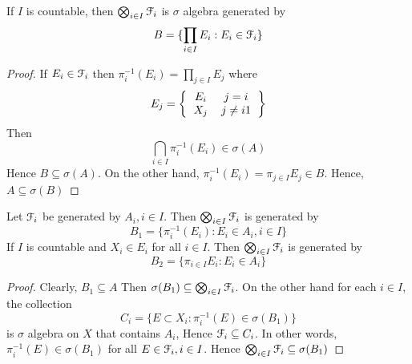 \documentclass[a4paper,english,12pt]{article}
\begin{document}
\begin{prop}
	If $I$ is countable, then $\bigotimes_{i\in I} \mathcal{F}_i$ is $\sigma$ algebra generated by \[B= \{\prod_{i\in I} E_i : E_i \in \mathcal{F}_i\}\]
\end{prop}
\begin{proof}
If $E_i \in \mathcal{F}_i$ then $\pi_i ^ {-1}(E_i) = \prod_{j\in I} E_j$ where \[E_j =  
\left \{
  \begin{tabular}{ccc}
  $E_i$ &  $j=i$  \\
  $X_j$  & $j \neq i$1 
  \end{tabular}
\right \}
\]  Then  \[ \bigcap_{i\in I} \pi_i ^{-1} (E_i) \in \sigma(A)\]  Hence $B \subseteq \sigma(A)$. On the other hand, $\pi_i ^{-1} (E_i) = \pi_{j\in I} E_j \in B$. Hence, $A \subseteq \sigma(B)$
\end{proof}
\begin{prop}
Let $\mathcal{F}_i$ be generated by $A_i, i \in I$. Then $\bigotimes_{i\in I} \mathcal{F}_i$ is generated by  \[B_1 = \{\pi_i^{-1} (E_i) : E_i \in A_i, i \in I\}\]  If $I$ is countable and $X_i \in E_i $ for all $i \in I$. Then $\bigotimes_{i\in I} \mathcal{F}_i$ is generated by  \[B_2 = \{\pi_{i\in I} E_i: E_i \in A_i \}\] 
\end{prop}
\begin{proof}
Clearly, $B_1 \subseteq A$ Then $\sigma(B_1) \subseteq \bigotimes_{i\in I} \mathcal{F}_i$. On the other hand for each $i \in I$, the collection  \[C_i = \{E \subset X_i :\pi_i^{-1} (E) \in \sigma(B_1)\}\] is $\sigma$ algebra on $X$ that contains $A_i$, Hence $\mathcal{F}_i \subseteq C_i$. In other words, $\pi_i^{-1}(E) \in \sigma(B_1)$ for all $E \in \mathcal{F}_i, i \in I$. Hence $\bigotimes_{i \in I} \mathcal{F}_i \subseteq \sigma (B_1)$


\end{proof}
\end{document}
